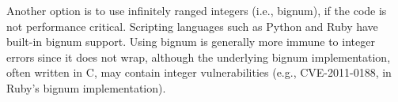 Another option is to use infinitely ranged integers (i.e., bignum),
if the code is not performance critical.  Scripting languages such
as Python and Ruby have built-in bignum support.  Using bignum is
generally more immune to integer errors since it does not wrap,
although the underlying bignum implementation, often written in C,
may contain integer vulnerabilities (e.g., CVE-2011-0188,
in Ruby's bignum implementation).
\fi
%





